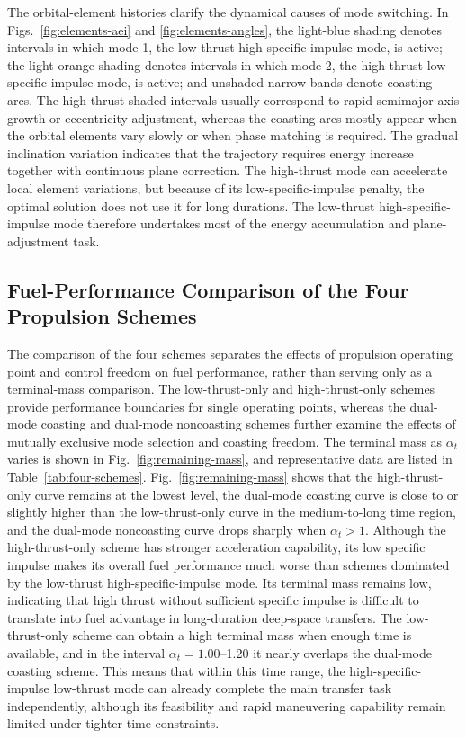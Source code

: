\documentclass{IEEEtaes}
\begin{document}
The orbital-element histories clarify the dynamical causes of mode switching. In Figs.~\ref{fig:elements-aei} and \ref{fig:elements-angles}, the light-blue shading denotes intervals in which mode 1, the low-thrust high-specific-impulse mode, is active; the light-orange shading denotes intervals in which mode 2, the high-thrust low-specific-impulse mode, is active; and unshaded narrow bands denote coasting arcs. The high-thrust shaded intervals usually correspond to rapid semimajor-axis growth or eccentricity adjustment, whereas the coasting arcs mostly appear when the orbital elements vary slowly or when phase matching is required. The gradual inclination variation indicates that the trajectory requires energy increase together with continuous plane correction. The high-thrust mode can accelerate local element variations, but because of its low-specific-impulse penalty, the optimal solution does not use it for long durations. The low-thrust high-specific-impulse mode therefore undertakes most of the energy accumulation and plane-adjustment task.

\subsection{Fuel-Performance Comparison of the Four Propulsion Schemes}
The comparison of the four schemes separates the effects of propulsion operating point and control freedom on fuel performance, rather than serving only as a terminal-mass comparison. The low-thrust-only and high-thrust-only schemes provide performance boundaries for single operating points, whereas the dual-mode coasting and dual-mode noncoasting schemes further examine the effects of mutually exclusive mode selection and coasting freedom. The terminal mass as $\alpha_t$ varies is shown in Fig.~\ref{fig:remaining-mass}, and representative data are listed in Table~\ref{tab:four-schemes}. Fig.~\ref{fig:remaining-mass} shows that the high-thrust-only curve remains at the lowest level, the dual-mode coasting curve is close to or slightly higher than the low-thrust-only curve in the medium-to-long time region, and the dual-mode noncoasting curve drops sharply when $\alpha_t>1$. Although the high-thrust-only scheme has stronger acceleration capability, its low specific impulse makes its overall fuel performance much worse than schemes dominated by the low-thrust high-specific-impulse mode. Its terminal mass remains low, indicating that high thrust without sufficient specific impulse is difficult to translate into fuel advantage in long-duration deep-space transfers. The low-thrust-only scheme can obtain a high terminal mass when enough time is available, and in the interval $\alpha_t=1.00$--1.20 it nearly overlaps the dual-mode coasting scheme. This means that within this time range, the high-specific-impulse low-thrust mode can already complete the main transfer task independently, although its feasibility and rapid maneuvering capability remain limited under tighter time constraints.
\end{document}
